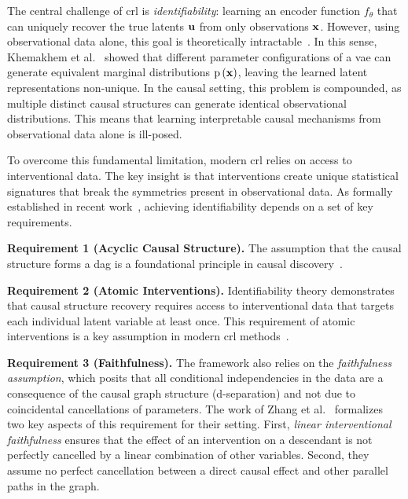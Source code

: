 \documentclass[10pt,letterpaper]{article}
\theoremstyle{definition}
\theoremstyle{remark}
\newcommand{\variables}{\rvx}
\newcommand{\latentcausalvars}{\rvu}
\newcommand{\practicalencoder}{f_\theta}
\newcommand{\pdf}[1]{\operatorname{p}\left(#1\right)}
\begin{document}
The central challenge of \gls{crl} is \emph{identifiability}: learning an encoder function $\practicalencoder$ that can uniquely recover the true latents $\latentcausalvars$ from only observations $\variables$.
However, using observational data alone, this goal is theoretically intractable~\cite{pearl2009causality}.
In this sense, Khemakhem et al.~\cite{khemakhem2020variational} showed that different parameter configurations of a \gls{vae} can generate equivalent marginal distributions $\pdf{\variables}$, leaving the learned latent representations non-unique.
In the causal setting, this problem is compounded, as multiple distinct causal structures can generate identical observational distributions.
This means that learning interpretable causal mechanisms from observational data alone is ill-posed.

To overcome this fundamental limitation, modern \gls{crl} relies on access to interventional data.
The key insight is that interventions create unique statistical signatures that break the symmetries present in observational data.
As formally established in recent work~\cite{scholkopf2021toward}, achieving identifiability depends on a set of key requirements.

\textbf{Requirement 1 (Acyclic Causal Structure).}
The assumption that the causal structure forms a \gls{dag} is a foundational principle in causal discovery~\cite{pearl2009causality}.

\textbf{Requirement 2 (Atomic Interventions).}
Identifiability theory demonstrates that causal structure recovery requires access to interventional data that targets each individual latent variable at least once.
This requirement of atomic interventions is a key assumption in modern \gls{crl} methods~\cite{zhang2023identifiability,von2023nonparametric}.

\textbf{Requirement 3 (Faithfulness).}
The framework also relies on the \emph{faithfulness assumption}, which posits that all conditional independencies in the data are a consequence of the causal graph structure (d-separation) and not due to coincidental cancellations of parameters.
The work of Zhang et al.~\cite{zhang2023identifiability} formalizes two key aspects of this requirement for their setting.
First, \emph{linear interventional faithfulness} ensures that the effect of an intervention on a descendant is not perfectly cancelled by a linear combination of other variables.
Second, they assume no perfect cancellation between a direct causal effect and other parallel paths in the graph.
\end{document}
